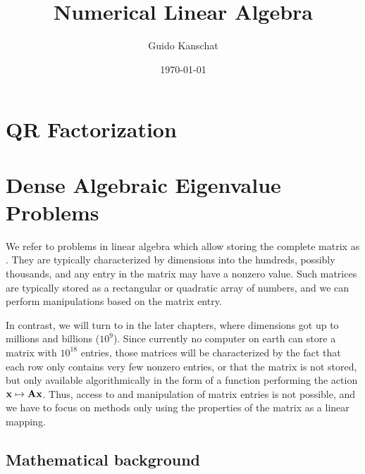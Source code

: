\usepackage{algpseudocode}
\lstset{language=Python,numbers=left,resetmargins=true,xleftmargin=8pt,basicstyle=\small,numberstyle=\scriptsize}
\usetikzlibrary{svg.path}
\usetikzlibrary{matrix,fit}


\title{Numerical Linear Algebra}
\author{Guido Kanschat}
\date{\today}

\def\esp#1{V_{#1}}


\maketitle
\tableofcontents
\chapter{QR Factorization}
\label{chap:qr}


\chapter{Dense Algebraic Eigenvalue Problems}
\label{chap:dense-eigen}

\begin{intro}
  We refer to problems in linear algebra which allow storing the
  complete matrix as . They are typically
  characterized by dimensions into the hundreds, possibly thousands,
  and any entry in the matrix may have a nonzero value. Such matrices
  are typically stored as a rectangular or quadratic array of numbers,
  and we can perform manipulations based on the matrix entry.

  In contrast, we will turn to  in the
  later chapters, where dimensions got up to millions and billions
  ($10^9$). Since currently no computer on earth can store a matrix
  with $10^{18}$ entries, those matrices will be characterized by the
  fact that each row only contains very few nonzero entries, or that
  the matrix is not stored, but only available algorithmically in the
  form of a function performing the action $\mathbf x\mapsto \mathbf A
  \mathbf x$. Thus, access to and manipulation of matrix entries is not
  possible, and we have to focus on methods only using the properties
  of the matrix as a linear mapping.
\end{intro}

\section{Mathematical background}
